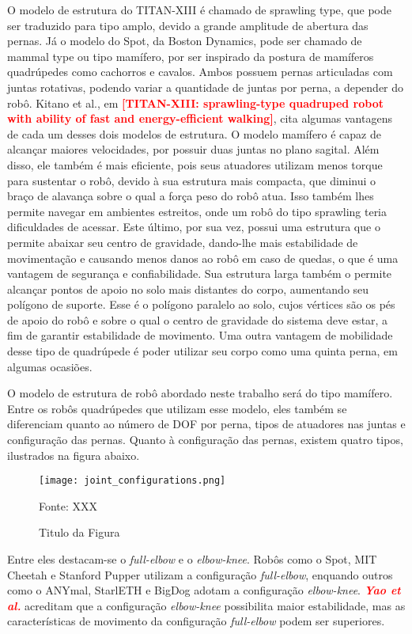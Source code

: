 \documentclass[../main.tex]{subfiles}
\begin{document}
  O modelo de estrutura do TITAN-XIII é chamado de sprawling type, que pode ser traduzido para tipo amplo, devido a grande amplitude de abertura das pernas. Já o modelo do Spot, da Boston Dynamics, pode ser chamado de mammal type ou tipo mamífero, por ser inspirado da postura de mamíferos quadrúpedes como cachorros e cavalos. Ambos possuem pernas articuladas com juntas rotativas, podendo variar a quantidade de juntas por perna, a depender do robô. Kitano et al., em \textbf{\textcolor{red}{[TITAN-XIII: sprawling-type quadruped robot with ability of fast and energy-efficient walking]}}, cita algumas vantagens de cada um desses dois modelos de estrutura. O modelo mamífero é capaz de alcançar maiores velocidades, por possuir duas juntas no plano sagital. Além disso, ele também é mais eficiente, pois seus atuadores utilizam menos torque para sustentar o robô, devido à sua estrutura mais compacta, que diminui o braço de alavança sobre o qual a força peso do robô atua. Isso também lhes permite navegar em ambientes estreitos, onde um robô do tipo sprawling teria dificuldades de acessar. Este último, por sua vez, possui uma estrutura que o permite abaixar seu centro de gravidade, dando-lhe mais estabilidade de movimentação e causando menos danos ao robô em caso de quedas, o que é uma vantagem de segurança e confiabilidade. Sua estrutura larga também o permite alcançar pontos de apoio no solo mais distantes do corpo, aumentando seu polígono de suporte. Esse é o polígono paralelo ao solo, cujos vértices são os pés de apoio do robô e sobre o qual o centro de gravidade do sistema deve estar, a fim de garantir estabilidade de movimento. Uma outra vantagem de mobilidade desse tipo de quadrúpede é poder utilizar seu corpo como uma quinta perna, em algumas ocasiões.

  O modelo de estrutura de robô abordado neste trabalho será do tipo mamífero. Entre os robôs quadrúpedes que utilizam esse modelo, eles também se diferenciam quanto ao número de DOF por perna, tipos de atuadores nas juntas e configuração das pernas. Quanto à configuração das pernas, existem quatro tipos, ilustrados na figura abaixo.

  \begin{figure}[h]
    \centering
    \caption{Titulo da Figura}
    \texttt{[image: joint\_configurations.png]}
    
    Fonte: XXX
    \label{fig:joint_configurations}
  \end{figure}

  Entre eles destacam-se o \textit{full-elbow} e o \textit{elbow-knee}. Robôs como o Spot, MIT Cheetah e Stanford Pupper utilizam a configuração \textit{full-elbow}, enquando outros como o ANYmal, StarlETH e BigDog adotam a configuração  \textit{elbow-knee}. \textbf{\textcolor{red}{\textit{Yao et al.}}} acreditam que a configuração \textit{elbow-knee} possibilita maior estabilidade, mas as características de movimento da configuração \textit{full-elbow} podem ser superiores.
\end{document}
